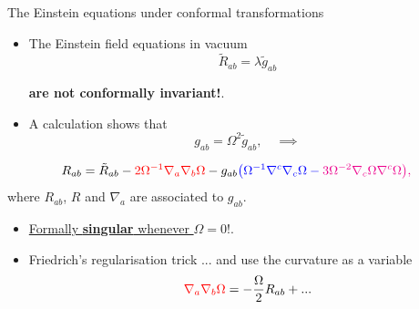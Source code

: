\documentclass[10pt]{beamer}
\theoremstyle{plain}
\begin{document}
\begin{frame}{The Einstein equations under conformal transformations}
\begin{itemize}
   \item The Einstein field equations in vacuum
     \vspace{-2mm}
\[
\tilde{R}_{ab} = \lambda \tilde{g}_{ab}
\]
 \vspace{-5mm}
 \begin{center}\large{\textbf{are not conformally invariant!}}.
 \end{center}
 \pause
\vspace{2mm}
\item A calculation shows that
\[
g_{ab} = \Omega^2 \tilde{g}_{ab}, \quad \implies
\]\vspace{-3mm}
\end{itemize}
\[
R_{ab} = \tilde{R}_{ab} -
\textcolor{red}{ 2\Omega^{-1} {\nabla}_a {\nabla}_b \Omega }
- {g}_{ab}\color{blue}{\big( \Omega^{-1} {\nabla}^c {\nabla}_c \Omega}
- \color{magenta}{3\Omega^{-2} {\nabla}_c \Omega {\nabla}^c \Omega\big)} ,
\]
where $R_{ab}$, $R$ and $\nabla_a$ are associated to
$g_{ab}$.
 \vspace{3mm}

\begin{itemize}
\item  \underline{Formally \textbf{singular}  whenever $\Omega=0$}!.
  \vspace{3mm}
  \pause
\item Friedrich's regularisation trick ... and  use the curvature as a variable
  \vspace{-2mm}
  \[ \textcolor{red}{{\nabla}_a {\nabla}_b \Omega}  = -\frac{\Omega}{2} {R}_{ab} + ...\]
  \vspace{-7mm}

\end{itemize}
\end{frame}
\end{document}
